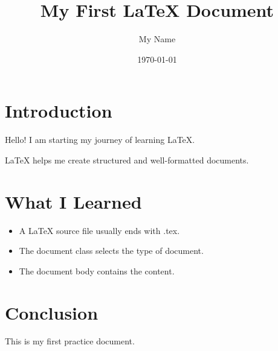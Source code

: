 \documentclass[12pt,a4paper]{article}
\title{My First LaTeX Document}
\author{My Name}
\date{\today}
\begin{document}
\maketitle

\section{Introduction}
Hello! I am starting my journey of learning LaTeX.

LaTeX helps me create structured and well-formatted documents.

\section{What I Learned}
\begin{itemize}
    \item A LaTeX source file usually ends with .tex.
    \item The document class selects the type of document.
    \item The document body contains the content.
\end{itemize}

\section{Conclusion}
This is my first practice document.
\end{document}
